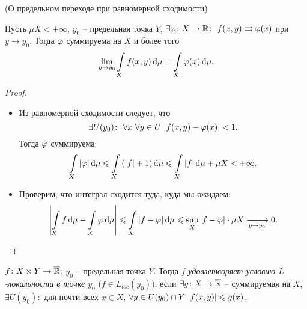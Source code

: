 \begin{theorem}(О предельном переходе при равномерной сходимости)

    Пусть $\mu{X} < +\infty$, $y_0$ -- предельная точка $Y$, $\exists \varphi \colon X \to \mathbb{R}\colon~
    f(x, y) \rightrightarrows \varphi(x)$ при $y \to y_0$. Тогда $\varphi$ суммируема на $X$ и более того
    \[
        \lim_{y \to y_0}{\int\limits_X{f(x, y) \,\mathrm{d} \mu}} = \int\limits_X{\varphi(x) \,\mathrm{d} \mu}
    .\]
\end{theorem}
\begin{proof}
    \enewline
    \begin{itemize}
        \item Из равномерной сходимости следует, что 
            \[
                \exists U(y_0)\colon~ \forall x~ \forall y \in U~ |f(x, y) - \varphi(x)| < 1
            .\]
            Тогда $\varphi$ суммируема:
            \[
                \int\limits_X{|\varphi| \,\mathrm{d} \mu} \leqslant \int\limits_X{(|f| + 1) \,\mathrm{d} \mu} 
                \leqslant \int\limits_X{|f| \,\mathrm{d} \mu} + \mu{X} < +\infty
            .\]
        \item Проверим, что интеграл сходится туда, куда мы ожидаем:
            \[
                \abs*{\intl_X{f \dd \mu} - \intl_X{\f \dd \mu}} \leqslant \intl_X{\abs*{f - \f} \dd \mu}
                \leqslant \sup_X{\abs{f - \f}} \cdot \mu{X} \xrightarrow[y \to y_0]{} 0 
            .\]
    \end{itemize}
\end{proof}

\begin{definition}
    $f \colon X \times Y \to \overline{\mathbb{R}}$, $y_0$ -- предельная точка $Y$. Тогда $f$ 
    \textit{удовлетворяет условию $L$-локальности в точке $y_0$} ($f \in L_{loc}(y_0)$), если 
    $\exists g \colon X \to \overline{\mathbb{R}}$ -- суммируемая на $X$, $\exists U(y_0)\colon$
    для почти всех $x \in X$, $\forall y \in U(y_0) \cap Y~ \abs*{f(x, y)} \leqslant g(x)$.
\end{definition}

